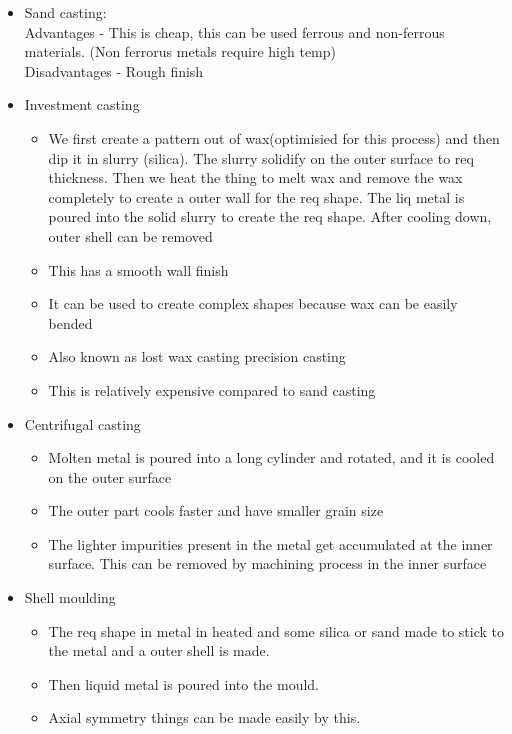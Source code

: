 \documentclass{article}
\begin{document}
\begin{itemize}
	\item Sand casting:\\
		Advantages - This is cheap, this can be used ferrous and non-ferrous materials. (Non ferrorus metals require high temp)\\
		Disadvantages - Rough finish

	\item Investment casting
		\begin{itemize}
			\item We first create a pattern out of wax(optimisied for this process)  and then dip it in slurry (silica). The slurry solidify on the outer surface to req thickness. Then we heat the thing to melt wax and remove the wax completely to create a outer wall for the req shape. The liq metal is poured into the solid slurry to create the req shape. After cooling down, outer shell can be removed
			\item This has a smooth wall finish
			\item It can be used to create complex shapes because wax can be easily bended 
			\item Also known as lost wax casting precision casting
			\item This is relatively expensive compared to sand casting
		\end{itemize}


\item Centrifugal casting
	\begin{itemize}
	\item Molten metal is poured into a long cylinder and rotated, and it is cooled on the outer surface
	\item The outer part cools faster and have smaller grain size
	\item The lighter impurities present in the metal get accumulated at the inner surface. This can be removed by machining process in the inner surface
	\end{itemize}

	
\item Shell moulding
	\begin{itemize}
	\item The req shape in metal in heated and some silica or sand made to stick to the metal and a outer shell is made.
	\item Then liquid metal is poured into the mould.
	\item Axial symmetry things can be made easily by this.
	\end{itemize}



\end{itemize}
\end{document}
